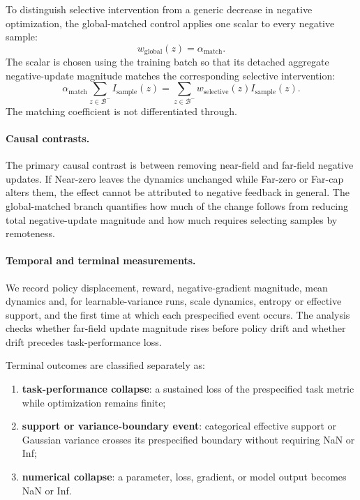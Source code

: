 \documentclass[sigconf,anonymous,review]{acmart}
\theoremstyle{acmdefinition}
\begin{document}
To distinguish selective intervention from a generic decrease in
negative optimization, the global-matched control applies one scalar
to every negative sample:
\begin{equation}
    w_{\mathrm{global}}(z)
    =
    \alpha_{\mathrm{match}}.
    \label{eq:causal_global_weight}
\end{equation}
The scalar is chosen using the training batch so that its detached aggregate
negative-update magnitude matches the corresponding selective
intervention:
\begin{equation}
    \alpha_{\mathrm{match}}
    \sum_{z\in\mathcal B^-}
        I_{\mathrm{sample}}(z)
    =
    \sum_{z\in\mathcal B^-}
        w_{\mathrm{selective}}(z)
        I_{\mathrm{sample}}(z).
    \label{eq:causal_budget_match}
\end{equation}
The matching coefficient is not differentiated through.

\paragraph{Causal contrasts.}
The primary causal contrast is between removing near-field and
far-field negative updates. If Near-zero leaves the dynamics unchanged
while Far-zero or Far-cap alters them, the effect cannot be attributed
to negative feedback in general. The global-matched branch quantifies
how much of the change follows from reducing total negative-update magnitude
and how much requires selecting samples by remoteness.

\paragraph{Temporal and terminal measurements.}
We record policy displacement, reward, negative-gradient magnitude,
mean dynamics and, for learnable-variance runs, scale dynamics, entropy or effective support, and the first
time at which each prespecified event occurs. The analysis checks whether
far-field update magnitude rises before policy drift and whether drift precedes
task-performance loss.

Terminal outcomes are classified separately as:

\begin{enumerate}
    \item \textbf{task-performance collapse}: a sustained loss of the
    prespecified task metric while optimization remains finite;
    \item \textbf{support or variance-boundary event}: categorical
    effective support or Gaussian variance crosses its prespecified
    boundary without requiring NaN or Inf;
    \item \textbf{numerical collapse}: a parameter, loss, gradient, or
    model output becomes NaN or Inf.
\end{enumerate}
\end{document}

